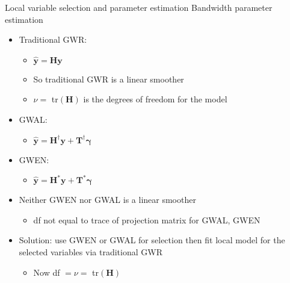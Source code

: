 \documentclass[12pt,t]{beamer}
\newcommand{\subt}[1]{{\footnotesize \color{subtitle} {#1}}}
\begin{document}
\begin{frame}{Local variable selection and  parameter estimation}
\subt{Bandwidth parameter estimation}

\bigskip 
\begin{itemize}
  \item Traditional GWR:
  \begin{itemize}
    \item $\hat{\bm{y}} = \bm{H} \bm{y}$
    \item So traditional GWR is a linear smoother
    \item $\nu = $ tr$(\bm{H})$ is the degrees of freedom for the model
  \end{itemize}
  \item GWAL:
  \begin{itemize}
    \item $\hat{\bm{y}} = \bm{H}^{\dagger}\bm{y} + \bm{T}^{\dagger}\bm{\gamma}$
  \end{itemize}  
  \item GWEN:
  \begin{itemize}
    \item $\hat{\bm{y}} = \bm{H}^{*}\bm{y} + \bm{T}^{*}\bm{\gamma}$
  \end{itemize}  
  \item Neither GWEN nor GWAL is a linear smoother
  \begin{itemize}
    \item df not equal to trace of projection matrix for GWAL, GWEN
  \end{itemize} 
  \item Solution: use GWEN or GWAL for selection then fit local model for the selected variables via traditional GWR
  \begin{itemize}
    \item Now df $= \nu = $ tr$(\bm{H})$
  \end{itemize} 
\end{itemize}

\end{frame}
\end{document}
